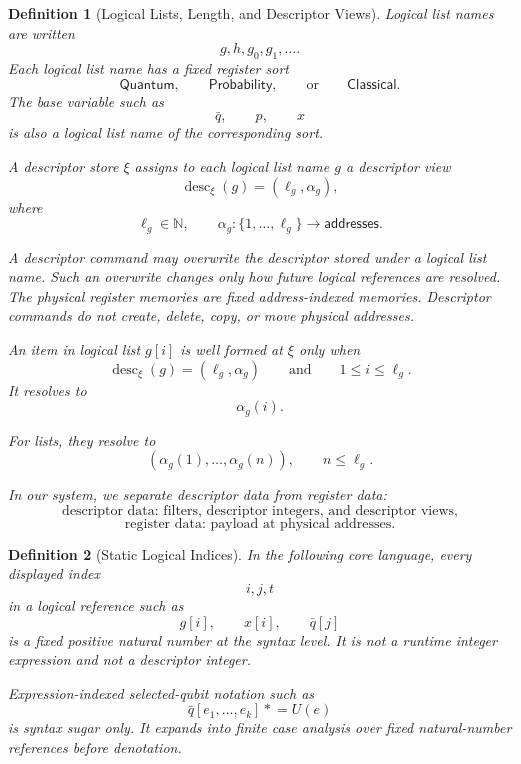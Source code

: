 \documentclass[acmsmall,screen,review,anonymous,nonacm]{acmart}
\newtheorem{definition}{Definition}[section]
\theoremstyle{defn_style}
\newcommand{\asteq}{\mathrel{*}=}
\begin{document}
\begin{definition}[Logical Lists, Length, and Descriptor Views]
Logical list names are written
  \[
  g,h,g_0,g_1,\ldots .
  \]
  Each logical list name has a fixed register sort
  \[
  \mathsf{Quantum},
  \qquad
  \mathsf{Probability},
  \qquad
  \text{or}
  \qquad
  \mathsf{Classical}.
  \]
  The base variable such as
  \[
  \bar q,
  \qquad
  p,
  \qquad
  x
  \]
  is also a logical list name of the corresponding sort.
  
  A descriptor store \(\xi\) assigns to each logical list name \(g\) a descriptor
  view
  \[
  \operatorname{desc}_{\xi}(g)=(\ell_g,\alpha_g),
  \]
  where
  \[
  \ell_g\in\mathbb N,
  \qquad
  \alpha_g:\{1,\ldots,\ell_g\}\to \mathsf{addresses}.
  \]
  
  A descriptor command may overwrite the descriptor stored under a logical list
  name. Such an overwrite changes only how future logical references are
  resolved. The physical register memories are fixed address-indexed memories. Descriptor
  commands do not create, delete, copy, or move physical addresses.
  
  An item in logical list \(g[i]\) is well formed at \(\xi\) only when
  \[
  \operatorname{desc}_{\xi}(g)=(\ell_g,\alpha_g)
  \qquad
  \text{and}
  \qquad
  1\le i\le \ell_g.
  \]
  It resolves to
  \[\alpha_g(i).
  \]
  
  For lists, they resolve to
  \[(\alpha_g(1),\ldots,\alpha_g(n)),
  \qquad
  n\le \ell_g.
  \]
  
  In our system, we separate descriptor data from register data:
  \[
  \text{descriptor data: filters, descriptor integers, and descriptor views,}
  \]
  \[
  \text{register data: payload at physical addresses.}
  \]
  \end{definition}


  \begin{definition}[Static Logical Indices]
    In the following core language, every displayed index
    \[
    i,j,t
    \]
    in a logical reference such as
    \[
    g[i],
    \qquad
    x[i],
    \qquad
    \bar q[j]
    \]
    is a fixed positive natural number at the syntax level. It is not a runtime
    integer expression and not a descriptor integer.
    
    Expression-indexed selected-qubit notation such as
    \[
    \bar q[e_1,\ldots,e_k]\asteq U(e)
    \]
    is syntax sugar only. It expands into finite case analysis over fixed
    natural-number references before denotation.
    \end{definition}
\end{document}

